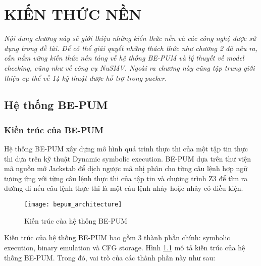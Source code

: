 
\newpage
\chapter{KIẾN THỨC NỀN}

\begin{concept}[15cm]
\textit{Nội dung chương này sẽ giới thiệu những kiến thức nền và các công nghệ được sử dụng trong đề tài. Để có thể giải quyết những thách thức như chương 2 đã nêu ra, cần nắm vững kiến thức nền tảng về hệ thống BE-PUM và lý thuyết về model checking, cũng như về công cụ NuSMV. Ngoài ra chương này cũng tập trung giới thiệu cụ thể về 14 kỹ thuật được hỗ trợ trong packer.}
\end{concept}

\section{Hệ thống BE-PUM}

\subsection{Kiến trúc của BE-PUM}

\hspace{0.5cm}Hệ thống BE-PUM xây dựng mô hình quá trình thực thi của một tập tin thực thi dựa trên kỹ thuật Dynamic symbolic execution. BE-PUM dựa trên thư viện mã nguồn mở Jackstab để dịch ngược mã nhị phân cho từng câu lệnh hợp ngữ tương ứng với từng câu lệnh thực thi của tập tin và chương trình Z3 để tìm ra đường đi nếu câu lệnh thực thi là một câu lệnh nhảy hoặc nhảy có điều kiện.

\begin{figure}[h]
\centering
\texttt{[image: bepum\_architecture]}
\caption{Kiến trúc của hệ thống BE-PUM}
\label{fig:BepumArchi}
\end{figure}

\hspace{0.5cm}Kiến trúc của hệ thống BE-PUM bao gồm 3 thành phần chính: symbolic execution, binary emulation và CFG storage. Hình \ref {fig:BepumArchi} mô tả kiến trúc của hệ thống BE-PUM. Trong đó, vai trò của các thành phần này như sau:

